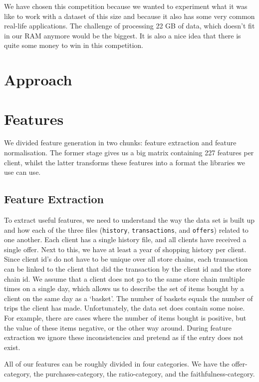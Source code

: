 \documentclass[a4paper]{article}
\begin{document}
We have chosen this competition because we wanted to experiment what it was like to work with a dataset of this size and because it also has some very common real-life applications. The challenge of processing 22 GB of data, which doesn't fit in our RAM anymore would be the biggest. It is also a nice idea that there is quite some money to win in this competition.

\section{Approach}


\section{Features}
We divided feature generation in two chunks: feature extraction and feature normalisation. The former stage gives us a big matrix containing 227 features per client, whilst the latter transforms these features into a format the libraries we use can use.

\subsection{Feature Extraction}
To extract useful features, we need to understand the way the data set is built up and how each of the three files (\texttt{history}, \texttt{transactions}, and \texttt{offers}) related to one another. Each client has a single history file, and all clients have received a single offer. Next to this, we have at least a year of shopping history per client. Since client id's do not have to be unique over all store chains, each transaction can be linked to the client that did the transaction by the client id and the store chain id. We assume that a client does not go to the same store chain multiple times on a single day, which allows us to describe the set of items bought by a client on the same day as a `basket'. The number of baskets equals the number of trips the client has made. Unfortunately, the data set does contain some noise. For example, there are cases where the number of items bought is positive, but the value of these items negative, or the other way around. During feature extraction we ignore these inconsistencies and pretend as if the entry does not exist.

All of our features can be roughly divided in four categories. We have the offer-category, the purchases-category, the ratio-category, and the faithfulness-category.
\end{document}
